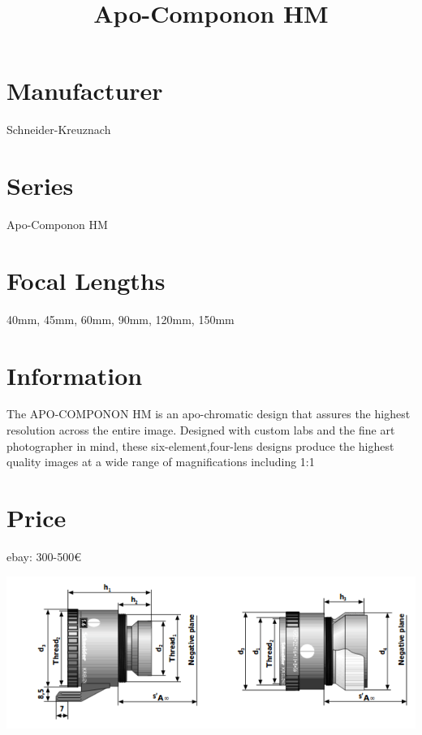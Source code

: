 \documentclass{article}
\begin{document}
\usepackage{titlesec}
\usepackage{graphicx}


\title{Apo-Componon HM}
\section{Manufacturer}
Schneider-Kreuznach
\section{Series}
Apo-Componon HM
\section{Focal Lengths}
40mm, 45mm, 60mm, 90mm, 120mm, 150mm   
\section{Information}
The APO-COMPONON HM is an apo-chromatic design that assures the highest resolution across the entire image. Designed with custom labs and the fine art photographer in mind, these six-element,four-lens designs produce the highest quality images at a wide range of magnifications including 1:1
\section{Price}
ebay: 300-500€

\includegraphics[width=\textwidth]{apo-componon-hm-1.png}
\end{document}
